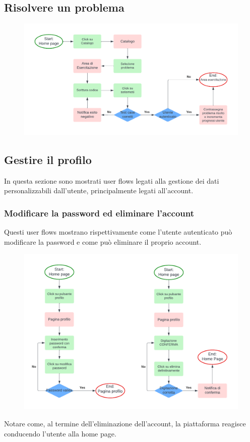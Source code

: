 \documentclass[11pt, a4paper]{article}
\theoremstyle{definition}
\begin{document}
\subsection{Risolvere un problema}
\begin{figure}[H]
\centering
\includegraphics[width = \linewidth]{materiale/ufesercizio.pdf}
\end{figure}
  

\subsection{Gestire il profilo}
In questa sezione sono mostrati user flows legati alla gestione dei
dati personalizzabili dall'utente, principalmente legati all'account.

\subsubsection*{Modificare la password ed eliminare l'account}
Questi user flows mostrano rispettivamente come l'utente autenticato può modificare
la password e come può eliminare il proprio account.
\begin{figure}[H]
\centering
\includegraphics[width = \linewidth]{materiale/ufuserpage.pdf}
\end{figure}
Notare come, al termine dell'eliminazione dell'account, la piattaforma
reagisce conducendo l'utente alla home page.
\end{document}

